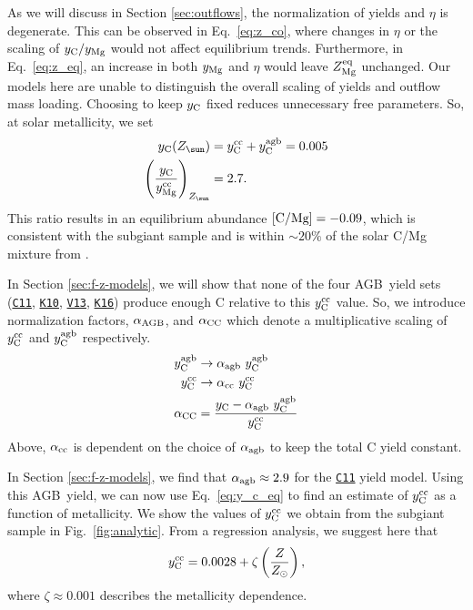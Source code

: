 \documentclass[fleqn,usenatbib]{mnras}
\newcommand{\cxi}{\texttt{\hyperlink{C11}{C11}}}
\newcommand{\kx}{\texttt{\hyperlink{K10}{K10}}}
\newcommand{\kxvi}{\texttt{\hyperlink{K16}{K16}}}
\newcommand{\vxiii}{\texttt{\hyperlink{V13}{V13}}}
\newcommand{\agb}{AGB}
\newcommand{\Yct}{\ensuremath{y_{\rm C}}}
\newcommand{\Ycc}{\ensuremath{y_{\rm C}^{\rm cc}}}
\newcommand{\Yoc}{\ensuremath{y_{\rm Mg}^{\rm cc}}}
\newcommand{\Ycagb}{\ensuremath{y_{\rm C}^{\rm agb}}}
\newcommand{\Zo}{%
    \ifmmode Z_{\sun}%
    \else $Z_{\sun}$%
    \fi}
\newcommand{\about}[1]{${\sim} #1$}
\begin{document}
As we will discuss in Section \ref{sec:outflows}, the normalization of yields and $\eta$ is degenerate. This can be observed in Eq.~\ref{eq:z_co}, where changes in $\eta$ or the scaling of $y_{\rm C}/y_{\rm Mg}$ would not affect equilibrium trends. Furthermore, in Eq.~\ref{eq:z_eq}, an increase in both $y_{\rm Mg}$ and $\eta$ would leave $Z_{\rm Mg}^{\rm eq}$ unchanged. Our models here are unable to distinguish the overall scaling of yields and outflow mass loading. Choosing to keep $y_{\rm C}$ fixed reduces unnecessary free parameters. So, at solar metallicity, we set
\begin{subequations}
    \begin{align}
        \Yct(\Zo) &= \Ycc + \Ycagb = 0.005 \\
        \left(\frac{\Yct}{\Yoc}\right)_{\Zo} &= 2.7.
    \end{align}
\end{subequations}
This ratio results in an equilibrium abundance ${\rm [C/Mg]} = -0.09$, which is consistent with the subgiant sample and is within \about{20\%} of the solar C/Mg mixture from \citet{asplund+09}.

In Section \ref{sec:f-z-models}, we will show that none of the four \agb\ yield sets (\cxi{}, \kx{}, \vxiii{}, \kxvi{}) produce enough C relative to this $\Ycc$ value. So, we introduce normalization factors, $\alpha_{\rm AGB}$, and $\alpha_{\rm CC}$ which denote a multiplicative scaling of $\Ycc$ and $\Ycagb$ respectively. 
\begin{subequations} \label{eq:alpha}
    \begin{align}
        \Ycagb &\rightarrow \alpha_{\rm agb}\ \Ycagb \\
        \Ycc &\rightarrow \alpha_{\rm cc}\ \Ycc\\
        \alpha_{\rm CC} &= \frac{\Yct - \alpha_{\rm agb}\ \Ycagb}{\Ycc}
    \end{align}
\end{subequations}
Above, $\alpha_{\rm cc}$ is dependent on the choice of $\alpha_{\rm agb}$ to keep the total C yield constant. 

In Section \ref{sec:f-z-models}, we find that $\alpha_{\rm agb}\approx 2.9$ for the \cxi{} yield model. Using this \agb\ yield, we can now use Eq.~\ref{eq:y_c_eq} to find an estimate of $\Ycc$ as a function of metallicity. We show the values of $\Ycc$ we obtain from the subgiant sample in Fig.~\ref{fig:analytic}. From a regression analysis, we suggest here that
\begin{equation}\label{eq:zeta}
    \Ycc = 0.0028 + \zeta\left(\frac{Z}{Z_\odot}\right),
\end{equation}
where $\zeta\approx0.001$ describes the metallicity dependence.
\end{document}
